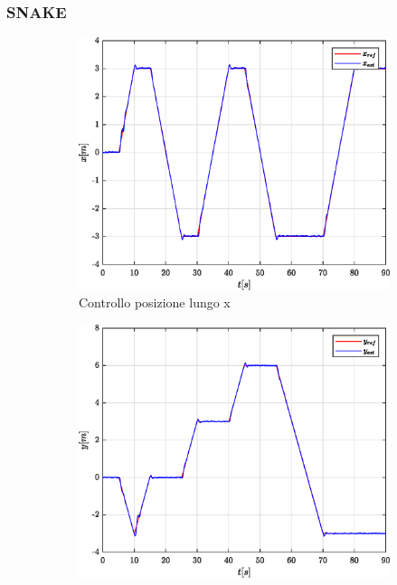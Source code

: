 \subsubsection{SNAKE}
\begin{figure}
	\centering
	\begin{subfigure}{0.45\textwidth}
		\centering
		\includegraphics[width=1\textwidth]{Simulazioni/Figure/SMC/SNAKE_MIL/PositionControlXPos}
		\caption{Controllo posizione lungo x}
	\end{subfigure}
	\hfill
	\begin{subfigure}{0.45\textwidth}
		\centering
		\includegraphics[width=1\textwidth]{Simulazioni/Figure/SMC/SNAKE_MIL/PositionControlYPos}

\end{subfigure}
\end{figure}
